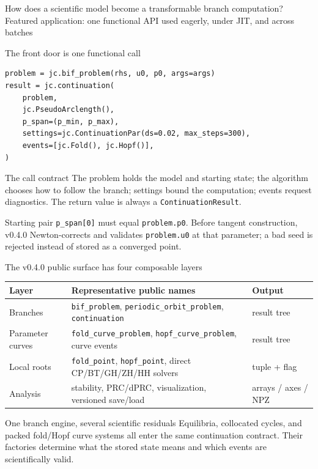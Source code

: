   {How does a scientific model become a transformable branch computation?}
  {Featured application: one functional API used eagerly, under JIT, and across batches}

\begin{frame}[fragile]{The front door is one functional call}
\releasedbadge
\begin{lstlisting}
problem = jc.bif_problem(rhs, u0, p0, args=args)
result = jc.continuation(
    problem,
    jc.PseudoArclength(),
    p_span=(p_min, p_max),
    settings=jc.ContinuationPar(ds=0.02, max_steps=300),
    events=[jc.Fold(), jc.Hopf()],
)
\end{lstlisting}
\begin{block}{The call contract}
The problem holds the model and starting state; the algorithm chooses how to
follow the branch; settings bound the computation; events request diagnostics.
The return value is always a \texttt{ContinuationResult}.
\end{block}
\begin{alertblock}{Starting pair}
\texttt{p\_span[0]} must equal \texttt{problem.p0}. Before tangent
construction, v0.4.0 Newton-corrects and validates \texttt{problem.u0} at that
parameter; a bad seed is rejected instead of stored as a converged point.
\end{alertblock}
\end{frame}

\begin{frame}{The v0.4.0 public surface has four composable layers}
\small
\centering
\renewcommand{\arraystretch}{1.25}
\begin{tabular}{p{}p{}p{}}
\toprule
Layer & Representative public names & Output \\
\midrule
Branches & \texttt{bif\_problem}, \texttt{periodic\_orbit\_problem},
\texttt{continuation} & result tree \\
Parameter curves & \texttt{fold\_curve\_problem},
\texttt{hopf\_curve\_problem}, curve events & result tree \\
Local roots & \texttt{fold\_point}, \texttt{hopf\_point}, direct
CP/BT/GH/ZH/HH solvers & tuple + flag \\
Analysis & stability, PRC/dPRC, visualization, versioned save/load & arrays / axes / NPZ \\
\bottomrule
\end{tabular}
\vspace{4mm}
\begin{block}{One branch engine, several scientific residuals}
Equilibria, collocated cycles, and packed fold/Hopf curve systems all enter
the same continuation contract. Their factories determine what the stored
state means and which events are scientifically valid.
\end{block}
\end{frame}

